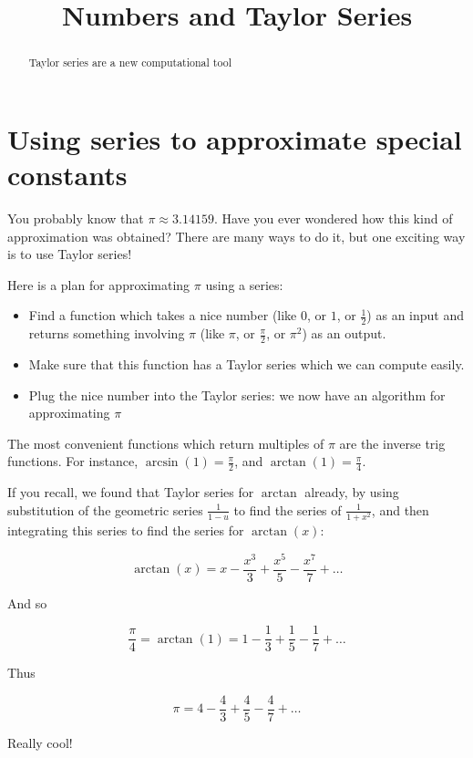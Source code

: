\documentclass{ximera}
\title[Dig-In:]{Numbers and Taylor Series}
\begin{document}
\begin{abstract}
  Taylor series are a new computational tool
\end{abstract}
\maketitle

\section{Using series to approximate special constants}

You probably know that $\pi  \approx 3.14159$.  Have you ever wondered how this kind of approximation was obtained?  There are many ways to do it, but one exciting way is to use Taylor series!

\begin{example}
	Here is a plan for approximating $\pi$ using a series:
		\begin{itemize}
			\item Find a function which takes a nice number (like $0$, or $1$, or $\frac{1}{2}$) as an input and returns something involving $\pi$ (like $\pi$, or $\frac{\pi}{2}$, or $\pi^2$) as an output.
			\item Make sure that this function has a Taylor series which we can compute easily.
			\item Plug the nice number into the Taylor series:  we now have an algorithm for approximating $\pi$
		\end{itemize} 
		
The most convenient functions which return multiples of $\pi$ are the inverse trig functions.  For instance, $\arcsin(1) = \frac{\pi}{2}$, and $\arctan(1) = \frac{\pi}{4}$.  

If you recall, we found that Taylor series for $\arctan$ already, by using substitution of the geometric series $\frac{1}{1-u}$ to find the series of $\frac{1}{1+x^2}$, and then integrating this series to find the series for $\arctan(x)$:


\[
\arctan(x) = x-\frac{x^3}{3}+\frac{x^5}{5}-\frac{x^7}{7}+\dots
\]

And so 

\[
\frac{\pi}{4} = \arctan(1) = 1-\frac{1}{3}+\frac{1}{5}-\frac{1}{7}+\dots
\]

Thus

\[
\pi =  4-\frac{4}{3}+\frac{4}{5}-\frac{4}{7}+\dots
\]

Really cool!


\end{example}
\end{document}
